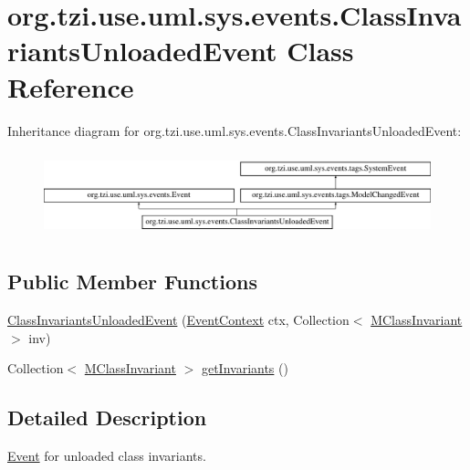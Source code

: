 \hypertarget{classorg_1_1tzi_1_1use_1_1uml_1_1sys_1_1events_1_1_class_invariants_unloaded_event}{\section{org.\-tzi.\-use.\-uml.\-sys.\-events.\-Class\-Invariants\-Unloaded\-Event Class Reference}
\label{classorg_1_1tzi_1_1use_1_1uml_1_1sys_1_1events_1_1_class_invariants_unloaded_event}
}
Inheritance diagram for org.\-tzi.\-use.\-uml.\-sys.\-events.\-Class\-Invariants\-Unloaded\-Event\-:\begin{figure}[H]
\begin{center}
\leavevmode
\includegraphics[height=2.463343cm]{classorg_1_1tzi_1_1use_1_1uml_1_1sys_1_1events_1_1_class_invariants_unloaded_event}
\end{center}
\end{figure}
\subsection*{Public Member Functions}
\begin{DoxyCompactItemize}
\item 
\hyperlink{classorg_1_1tzi_1_1use_1_1uml_1_1sys_1_1events_1_1_class_invariants_unloaded_event_a9dbc161c7e3023352900064dc7005def}{Class\-Invariants\-Unloaded\-Event} (\hyperlink{enumorg_1_1tzi_1_1use_1_1uml_1_1sys_1_1events_1_1tags_1_1_event_context}{Event\-Context} ctx, Collection$<$ \hyperlink{classorg_1_1tzi_1_1use_1_1uml_1_1mm_1_1_m_class_invariant}{M\-Class\-Invariant} $>$ inv)
\item 
Collection$<$ \hyperlink{classorg_1_1tzi_1_1use_1_1uml_1_1mm_1_1_m_class_invariant}{M\-Class\-Invariant} $>$ \hyperlink{classorg_1_1tzi_1_1use_1_1uml_1_1sys_1_1events_1_1_class_invariants_unloaded_event_a342963ba17fde044c46ef57c9a3be70c}{get\-Invariants} ()
\end{DoxyCompactItemize}


\subsection{Detailed Description}
\hyperlink{classorg_1_1tzi_1_1use_1_1uml_1_1sys_1_1events_1_1_event}{Event} for unloaded class invariants.


